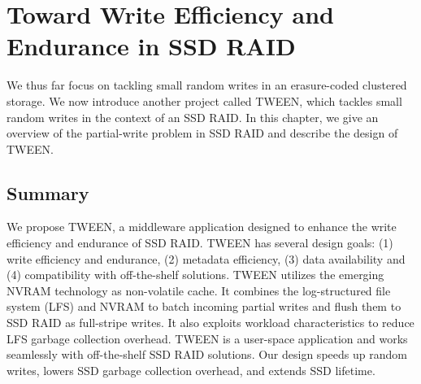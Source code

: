 \chapter{Toward Write Efficiency and Endurance in SSD RAID}
\label{chap:tween}

We thus far focus on tackling small random writes in an erasure-coded clustered
storage. We now introduce another project called TWEEN, which tackles small
random writes in the context of an SSD RAID. In this chapter, we give an
overview of the partial-write problem in SSD RAID and describe the design of
TWEEN.




\section{Summary}

We propose TWEEN, a middleware application designed to enhance the write
efficiency and endurance of SSD RAID. TWEEN has several design goals: (1)
write efficiency and endurance, (2) metadata efficiency, (3) data availability
and (4) compatibility with off-the-shelf solutions. TWEEN utilizes the
emerging NVRAM technology as non-volatile cache.  It combines the
log-structured file system (LFS) and NVRAM to batch incoming partial writes
and flush them to SSD RAID as full-stripe writes.  It also exploits workload
characteristics to reduce LFS garbage collection overhead.  TWEEN is a
user-space application and works seamlessly with off-the-shelf SSD RAID
solutions. Our design speeds up random writes, lowers SSD garbage collection 
overhead, and extends SSD lifetime.
